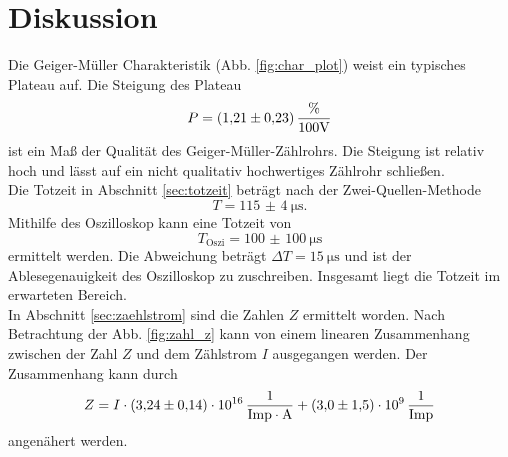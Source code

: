 \section{Diskussion}
\label{sec:Diskussion}
Die Geiger-Müller Charakteristik (Abb. \ref{fig:char_plot}) weist ein typisches Plateau auf.
Die Steigung des Plateau 
\begin{equation*}
    P = \SI{1.21(23)}{\frac{\percent}{100\volt}}
\end{equation*}
ist ein Maß der Qualität des Geiger-Müller-Zählrohrs.
Die Steigung ist relativ hoch und lässt auf ein nicht qualitativ hochwertiges Zählrohr schließen.
\\
Die Totzeit in Abschnitt \ref{sec:totzeit} beträgt nach der Zwei-Quellen-Methode
\begin{equation*}
    T = \SI{115(4)}{\micro\second} .
\end{equation*}
Mithilfe des Oszilloskop kann eine Totzeit von
\begin{equation*}
    T_\text{Oszi} = \SI{100(100)}{\micro\second}
\end{equation*}
ermittelt werden.
Die Abweichung beträgt $\Delta T = \SI{15}{\micro\second}$ und ist der Ablesegenauigkeit des Oszilloskop zu zuschreiben.
Insgesamt liegt die Totzeit im erwarteten Bereich.
\\
In Abschnitt \ref{sec:zaehlstrom} sind die Zahlen $Z$ ermittelt worden.
Nach Betrachtung der Abb. \ref{fig:zahl_z} kann von einem linearen Zusammenhang zwischen der Zahl $Z$ und dem Zählstrom $I$ ausgegangen werden.
Der Zusammenhang kann durch
\begin{equation}
    Z = I \cdot \SI{3.24(14)e16}{\frac{1}{Imp \cdot \ampere}} + \SI{3.0(15)e9}{\frac{1}{Imp}}
\end{equation}
angenähert werden.